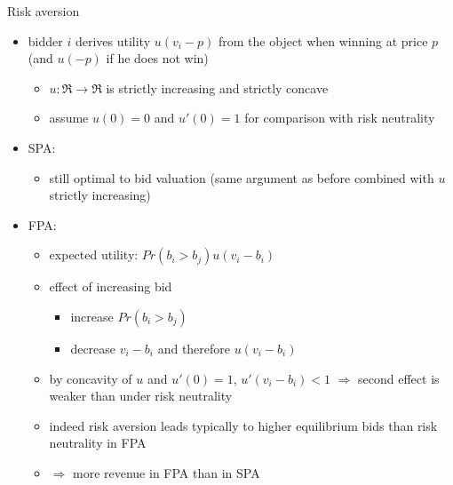\documentclass[bigger]{beamer}
\newcommand{\Ra}{\Rightarrow} \newcommand{\ra}{\rightarrow} \newcommand{\Lra}{\Leftrightarrow}
\begin{document}
\begin{frame}[label={sec:orgf1cd78c}]{Risk aversion}
\begin{itemize}
\item bidder \(i\) derives utility \(u(v_i-p)\) from the object when winning at price \(p\) (and \(u(-p)\) if he does not win)
\begin{itemize}
\item \(u:\Re\rightarrow\Re\) is strictly increasing and strictly concave
\item assume \(u(0)=0\) and \(u'(0)=1\) for comparison with risk neutrality
\end{itemize}
\item SPA:
\begin{itemize}
\item still optimal to bid valuation (same argument as before combined with \(u\) strictly increasing)
\end{itemize}
\item FPA:
\begin{itemize}
\item expected utility: \(Pr(b_i>b_j)u(v_i-b_i)\)
\item effect of increasing bid
\begin{itemize}
\item increase \(Pr(b_i>b_j)\)
\item decrease \(v_i-b_i\) and therefore \(u(v_i-b_i)\)
\end{itemize}
\item by concavity of \(u\) and \(u'(0)=1\), \(u'(v_i-b_i)<1\) \linebreak \(\Ra\) second effect is weaker than under risk neutrality
\item indeed risk aversion leads typically to higher equilibrium bids than risk neutrality in FPA
\item \(\Ra\) more revenue in FPA than in SPA
\end{itemize}
\end{itemize}
\end{frame}
\end{document}
